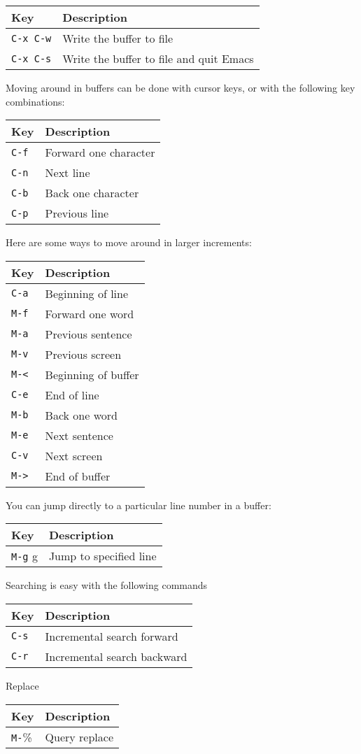 \begin{longtable}[]{ll}
\toprule
Key & Description\tabularnewline
\midrule
\endhead
\verb|C-x C-w| & Write the buffer to file \tabularnewline
\verb|C-x C-s| & Write the buffer to file and quit Emacs \tabularnewline
\bottomrule
\end{longtable}


Moving around in buffers can be done with cursor keys, or with the
following key combinations:

\begin{longtable}[]{ll}
\toprule
Key & Description\tabularnewline
\midrule
\endhead
\verb|C-f| & Forward one character\tabularnewline
\verb|C-n| & Next line\tabularnewline
\verb|C-b| & Back one character\tabularnewline
\verb|C-p| & Previous line\tabularnewline
\bottomrule
\end{longtable}

Here are some ways to move around in larger increments:

\begin{longtable}[]{ll}
\toprule
Key & Description\tabularnewline
\midrule
\endhead
\verb|C-a| & Beginning of line\tabularnewline
\verb|M-f| & Forward one word\tabularnewline
\verb|M-a| & Previous sentence\tabularnewline
\verb|M-v| & Previous screen\tabularnewline
\verb|M-<| & Beginning of buffer\tabularnewline
\verb|C-e| & End of line\tabularnewline
\verb|M-b| & Back one word\tabularnewline
\verb|M-e| & Next sentence\tabularnewline
\verb|C-v| & Next screen\tabularnewline
\verb|M->| & End of buffer\tabularnewline
\bottomrule
\end{longtable}

You can jump directly to a particular line number in a buffer:

\begin{longtable}[]{ll}
\toprule
Key & Description\tabularnewline
\midrule
\endhead
\verb|M-g| g & Jump to specified line\tabularnewline
\bottomrule
\end{longtable}

Searching is easy with the following commands

\begin{longtable}[]{ll}
\toprule
Key & Description\tabularnewline
\midrule
\endhead
\verb|C-s| & Incremental search forward\tabularnewline
\verb|C-r| & Incremental search backward\tabularnewline
\bottomrule
\end{longtable}

Replace

\begin{longtable}[]{ll}
\toprule
Key & Description\tabularnewline
\midrule
\endhead
\verb|M-|\% & Query replace\tabularnewline
\bottomrule
\end{longtable}

